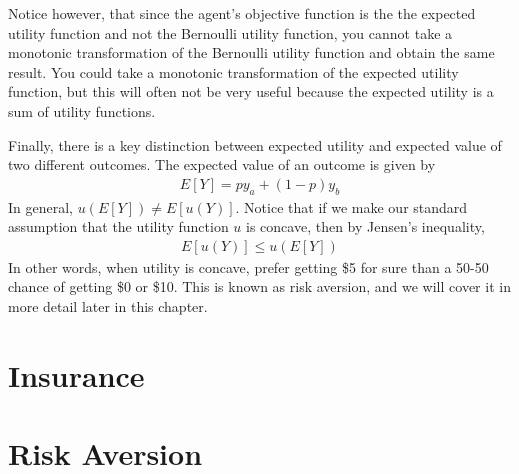 Notice however, that since the agent's objective function is the the expected utility function and not the Bernoulli utility function, you cannot take a monotonic transformation of the Bernoulli utility function and obtain the same result. You could take a monotonic transformation of the expected utility function, but this will often not be very useful because the expected utility is a sum of utility functions.

Finally, there is a key distinction between expected utility and expected value of two different outcomes. The expected value of an outcome is given by
\begin{align*}
    E[Y] = p y_a + (1 - p) y_b
\end{align*}
In general, $u(E[Y]) \neq E[u(Y)]$. Notice that if we make our standard assumption that the utility function $u$ is concave, then by Jensen's inequality,
\begin{align*}
    E[u(Y)] \leq u(E[Y])
\end{align*}
In other words, when utility is concave, prefer getting \$5 for sure than a 50-50 chance of getting \$0 or \$10. This is known as risk aversion, and we will cover it in more detail later in this chapter. 

\section{Insurance}

\section{Risk Aversion}